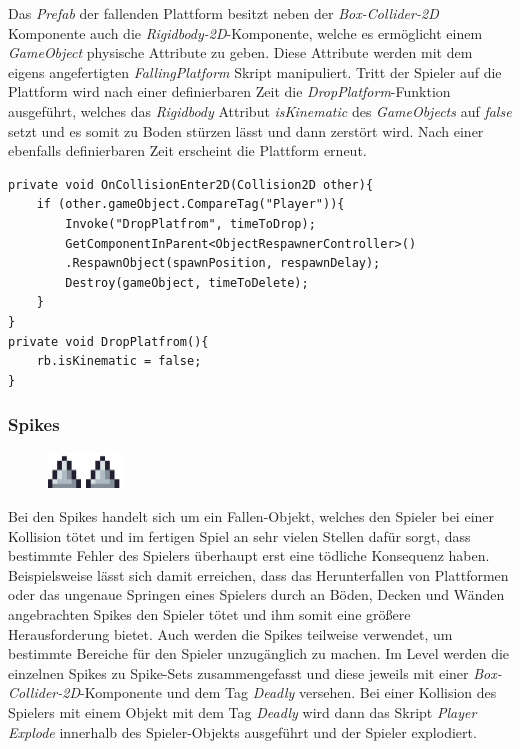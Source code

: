 Das \textit{Prefab} der fallenden Plattform besitzt neben der \textit{Box-Collider-2D} Komponente auch die \textit{Rigidbody-2D}-Komponente, welche es ermöglicht einem \textit{GameObject} physische Attribute zu geben. Diese Attribute werden mit dem eigens angefertigten \textit{FallingPlatform} Skript manipuliert. Tritt der Spieler auf die Plattform wird nach einer definierbaren Zeit die \textit{DropPlatform}-Funktion ausgeführt, welches das \textit{Rigidbody} Attribut \textit{isKinematic} des \textit{GameObjects} auf \textit{false} setzt und es somit zu Boden stürzen lässt und dann zerstört wird. Nach einer ebenfalls definierbaren Zeit erscheint die Plattform erneut.\\

\begin{lstlisting}[caption={Logik der fallenden Plattform},captionpos=b]
private void OnCollisionEnter2D(Collision2D other){
    if (other.gameObject.CompareTag("Player")){
        Invoke("DropPlatfrom", timeToDrop);
        GetComponentInParent<ObjectRespawnerController>()
        .RespawnObject(spawnPosition, respawnDelay);
        Destroy(gameObject, timeToDelete);
    }
}
private void DropPlatfrom(){
    rb.isKinematic = false;
}
\end{lstlisting}

\newpage

\subsubsection*{Spikes}

\begin{figure}[H]
\includegraphics[width=20mm]{Figures/spikes.png}
\label{fig:spikes}
\end{figure}

Bei den Spikes handelt sich um ein Fallen-Objekt, welches den Spieler bei einer Kollision tötet und im fertigen Spiel an sehr vielen Stellen dafür sorgt, dass bestimmte Fehler des Spielers überhaupt erst eine tödliche Konsequenz haben. Beispielsweise lässt sich damit erreichen, dass das Herunterfallen von Plattformen oder das ungenaue Springen eines Spielers durch an Böden, Decken und Wänden angebrachten Spikes den Spieler tötet und ihm somit eine größere Herausforderung bietet. Auch werden die Spikes teilweise verwendet, um bestimmte Bereiche für den Spieler unzugänglich zu machen. Im Level werden die einzelnen Spikes zu Spike-Sets zusammengefasst und diese jeweils mit einer \textit{Box-Collider-2D}-Komponente und dem Tag \textit{Deadly} versehen. Bei einer Kollision des Spielers mit einem Objekt mit dem Tag \textit{Deadly} wird dann das Skript \textit{Player Explode} innerhalb des Spieler-Objekts ausgeführt und der Spieler explodiert.

